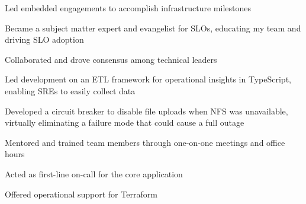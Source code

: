 \begin{job}
  
  \begin{accomplishments}
    \item Led embedded engagements to accomplish infrastructure milestones
    \item Became a subject matter expert and evangelist for SLOs, educating my team and driving SLO adoption
    \item Collaborated and drove consensus among technical leaders
    \item Led development on an ETL framework for operational insights in TypeScript, enabling SREs to easily collect data
  \end{accomplishments}

  \begin{extendedaccomplishments}
    \item Developed a circuit breaker to disable file uploads when NFS was unavailable, virtually eliminating a failure mode that could cause a full outage
    \item Mentored and trained team members through one-on-one meetings and office hours
    \item Acted as first-line on-call for the core application
    \item Offered operational support for Terraform
  \end{extendedaccomplishments}
\end{job}
